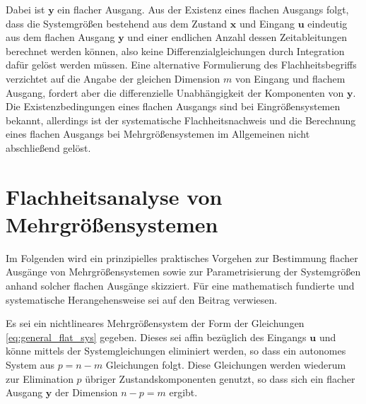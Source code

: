 Dabei ist $\mathbf{y}$ ein flacher Ausgang. Aus der Existenz eines flachen Ausgangs folgt, dass die Systemgrößen bestehend aus dem Zustand $\mathbf{x}$ und Eingang $\mathbf{u}$ eindeutig aus dem flachen Ausgang $\mathbf{y}$ und einer endlichen Anzahl dessen Zeitableitungen berechnet werden können, also keine Differenzialgleichungen durch Integration dafür gelöst werden müssen. Eine alternative Formulierung des Flachheitsbegriffs verzichtet auf die Angabe der gleichen Dimension $m$ von Eingang und flachem Ausgang, fordert aber die differenzielle Unabhängigkeit der Komponenten von $\mathbf{y}$. Die Existenzbedingungen eines ﬂachen Ausgangs sind bei Eingrößensystemen bekannt, allerdings ist der systematische Flachheitsnachweis und die Berechnung eines
ﬂachen Ausgangs bei Mehrgrößensystemen im Allgemeinen nicht abschließend gelöst. \cite[S. 185]{NLRT_Roebenack}

\section{Flachheitsanalyse von Mehrgrößensystemen}

Im Folgenden wird ein prinzipielles praktisches Vorgehen zur Bestimmung flacher Ausgänge von Mehrgrößensystemen sowie zur Parametrisierung der Systemgrößen anhand solcher flachen Ausgänge skizziert. Für eine mathematisch fundierte und systematische Herangehensweise sei auf den Beitrag \cite{Fritzsche2016} verwiesen.

Es sei ein nichtlineares Mehrgrößensystem der Form der Gleichungen \eqref{eq:general_flat_sys} gegeben. Dieses sei affin bezüglich des Eingangs $\mathbf{u}$ und könne mittels der Systemgleichungen eliminiert werden, so dass ein autonomes System aus $p = n - m$ Gleichungen folgt. Diese Gleichungen werden wiederum zur Elimination $p$ übriger Zustandskomponenten genutzt, so dass sich ein flacher Ausgang $\mathbf{y}$ der Dimension $n - p = m$ ergibt. 

